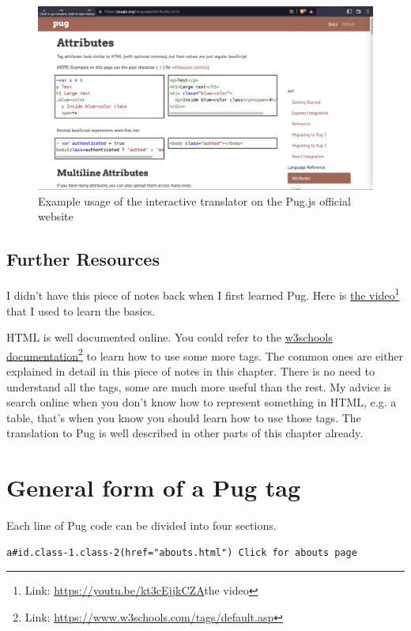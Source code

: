 \begin{figure}[h]
\centering
\includegraphics[width=13cm]{images/ch5-puginteractive.png}
\caption{Example usage of the interactive translator on the Pug.js official website}
\end{figure}

\subsection*{Further Resources}

I didn't have this piece of notes back when I first learned Pug. Here is \href{https://youtu.be/kt3cEjjkCZA}{the video}\footnote{Link: \url{https://youtu.be/kt3cEjjkCZA}{the video}} that I used to learn the basics. 

HTML is well documented online. You could refer to the \href{https://www.w3schools.com/tags/default.asp}{w3schools documentation}\footnote{Link: \url{https://www.w3schools.com/tags/default.asp}} to learn how to use some more tags. The common ones are either explained in detail in this piece of notes in this chapter. There is no need to understand all the tags, some are much more useful than the rest. My advice is search online when you don't know how to represent something in HTML, e.g. a table, that's when you know you should learn how to use those tags. The translation to Pug is well described in other parts of this chapter already.

\section{General form of a Pug tag}

Each line of Pug code can be divided into four sections.

\begin{lstlisting}[language=pug]
a#id.class-1.class-2(href="abouts.html") Click for abouts page
\end{lstlisting}

